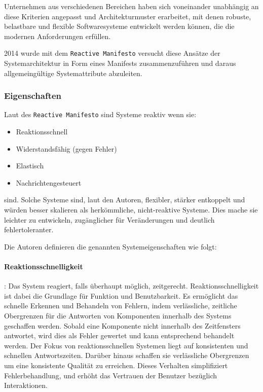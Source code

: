 Unternehmen aus verschiedenen Bereichen haben sich voneinander unabhängig an diese Kriterien angepasst und Architekturmuster
erarbeitet, mit denen robuste, belastbare und flexible Softwaresysteme entwickelt werden können, die die modernen Anforderungen
erfüllen.

2014 wurde mit dem \verb|Reactive Manifesto| versucht diese Ansätze der Systemarchitektur in Form eines Manifests zusammenzuführen
und daraus allgemeingültige Systemattribute abzuleiten.

\subsubsection{Eigenschaften}
\label{subsubsec:reaktive_systeme_eigenschaften}
Laut des \verb|Reactive Manifesto| sind Systeme reaktiv wenn sie:
\begin{itemize}
	\item Reaktionsschnell
	\item Widerstandsfähig (gegen Fehler)
	\item Elastisch
	\item Nachrichtengesteuert
\end{itemize}
sind.
Solche Systeme sind, laut den Autoren, flexibler, stärker entkoppelt und würden besser skalieren als herkömmliche, nicht-reaktive Systeme.
Dies mache sie leichter zu entwickeln, zugänglicher für Veränderungen und deutlich fehlertoleranter.

Die Autoren definieren die genannten Systemeigenschaften wie folgt:

\paragraph{Reaktionsschnelligkeit}: Das System reagiert, falls überhaupt möglich, zeitgerecht. Reaktionsschnelligkeit ist dabei die Grundlage für Funktion und
Benutzbarkeit. Es ermöglicht das schnelle Erkennen und Behandeln von Fehlern, indem verlässliche, zeitliche Obergrenzen für die Antworten von
Komponenten innerhalb des Systems geschaffen werden. Sobald eine Komponente nicht innerhalb des Zeitfensters antwortet, wird dies als Fehler gewertet und kann
entsprechend behandelt werden.
Der Fokus von reaktionsschnellen Systemen liegt auf konsistenten und schnellen Antwortszeiten. Darüber hinaus schaffen sie
verlässliche Obergrenzen um eine konsistente Qualität zu erreichen.
Dieses Verhalten simplifiziert Fehlerbehandlung, und erhöht das Vertrauen der Benutzer bezüglich Interaktionen.

